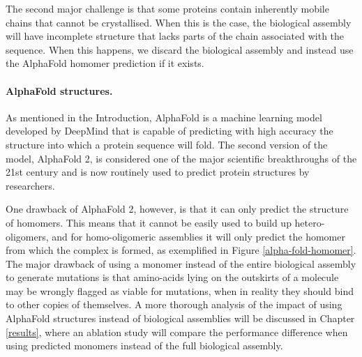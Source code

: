 The second major challenge is that some proteins contain inherently mobile chains that cannot be crystallised. When this is the case, the biological assembly will have incomplete structure that lacks parts of the chain associated with the sequence. When this happens, we discard the biological assembly and instead use the AlphaFold homomer prediction if it exists. 

\paragraph{AlphaFold structures.} As mentioned in the Introduction, AlphaFold is a machine learning model developed by DeepMind \cite{alphafold} that is capable of predicting with high accuracy the structure into which a protein sequence will fold. The second version of the model, AlphaFold 2, is considered one of the major scientific breakthroughs of the 21st century and is now routinely used to predict protein structures by researchers. 

One drawback of AlphaFold 2, however, is that it can only predict the structure of homomers. This means that it cannot be easily used to build up hetero-oligomers, and for homo-oligomeric assemblies it will only predict the homomer from which the complex is formed, as exemplified in Figure \ref{alpha-fold-homomer}. The major drawback of using a monomer instead of the entire biological assembly to generate mutations is that amino-acids lying on the outskirts of a molecule may be wrongly flagged as viable for mutations, when in reality they should bind to other copies of themselves. A more thorough analysis of the impact of using AlphaFold structures instead of biological assemblies will be discussed in Chapter \ref{results}, where an ablation study will compare the performance difference when using predicted monomers instead of the full biological assembly.


